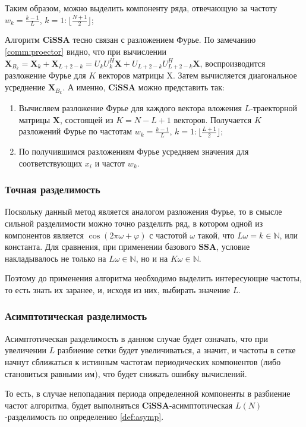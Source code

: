 \documentclass[a4paper, 11pt]{article}
\newcommand{\SSA}{\textbf{SSA}}
\newcommand{\CISSA}{\textbf{CiSSA}}
\begin{document}
Таким образом, можно выделить компоненту ряда, отвечающую за частоту $w_k = \frac{k-1}{L}$, $k = 1:\lfloor \frac{N+1}{2} \rfloor$;

Алгоритм $\CISSA$ тесно связан с разложением Фурье. По замечанию \ref{comm:proector} видно, что при вычислении $\mathbf X_{B_k} = \mathbf X_k + \mathbf X_{L+2-k} = U_k U_k^H \mathbf X + U_{L+2-k} U_{L+2-k}^H \mathbf X$, воспроизводится разложение Фурье для $K$ векторов матрицы $\mathrm X$. Затем вычисляется диагональное усреднение $\mathbf X_{B_k}$. А именно, $\CISSA$ можно представить так:
\begin{enumerate}
	\item Вычисляем разложение Фурье для каждого вектора вложения $L$-траекторной матрицы $\mathbf{X}$, состоящей из $K = N - L + 1$ векторов. Получается $K$ разложений Фурье по частотам $w_k = \frac{k-1}{L}$, $k = 1:\lfloor \frac{L+1}{2} \rfloor$;
	\item По получившимся разложениям Фурье усредняем значения для соответствующих $x_i$ и частот $w_k$.
\end{enumerate}

\subsubsection{Точная разделимость}
Поскольку данный метод является аналогом разложения Фурье, то в смысле сильной разделимости можно точно разделить ряд, в котором одной из компонентов является $\cos(2\pi \omega + \varphi)$ с частотой $\omega$ такой, что $L\omega = k \in \mathbb N$, или константа. Для сравнения, при применении базового $\SSA$, условие накладывалось не только на $L\omega \in \mathbb N$, но и на $K\omega \in \mathbb N$.

Поэтому до применения алгоритма необходимо выделить интересующие частоты, то есть знать их заранее, и, исходя из них, выбирать значение $L$.

\subsubsection{Асимптотическая разделимость}
Асимптотическая разделимость в данном случае будет означать, что при увеличении $L$ разбиение сетки будет увеличиваться, а значит, и частоты в сетке начнут сближаться к истинным частотам периодических компонентов (либо становиться равными им), что будет снижать ошибку вычислений.

То есть, в случае непопадания периода определенной компоненты в разбиение частот алгоритма, будет выполняться $\CISSA$-асимптотическая $L(N)$-разделимость по определению \ref{def:asymp}.
\end{document}
